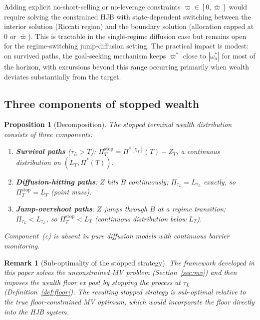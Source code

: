 \documentclass[11pt,a4paper]{article}
\numberwithin{equation}{section}
\newtheorem{proposition}[theorem]{Proposition}
\newtheorem{remark}[theorem]{Remark}
\begin{document}
Adding explicit no-short-selling or no-leverage constraints $\varpi \in [0, \bar\varpi]$ would require solving the constrained HJB with state-dependent switching between the interior solution (Riccati region) and the boundary solution (allocation capped at $0$ or $\bar\varpi$).  This is tractable in the single-regime diffusion case \citep{HuShiXu2022} but remains open for the regime-switching jump-diffusion setting.  The practical impact is modest: on survived paths, the goal-seeking mechanism keeps $\varpi^*$ close to $|\omega^*_a|$ for most of the horizon, with excursions beyond this range occurring primarily when wealth deviates substantially from the target.


\subsection{Three components of stopped wealth}\label{sec:three_comp}

\begin{proposition}[Decomposition]\label{prop:three_components}
The stopped terminal wealth distribution consists of three components:
\begin{enumerate}[label=(\alph*)]
\item \textbf{Survival paths} ($\tau_L > T$): $\Pi^{\mathrm{stop}}_T = \Pi^{*[\chi_T]}(T) - Z_T$, a continuous distribution on $(L_T, \Pi^*(T))$.
\item \textbf{Diffusion-hitting paths}: $Z$ hits $B$ continuously; $\Pi_{\tau_L} = L_{\tau_L}$ exactly, so $\Pi^{\mathrm{stop}}_T = L_T$ (point mass).
\item \textbf{Jump-overshoot paths}: $Z$ jumps through $B$ at a regime transition; $\Pi_{\tau_L} < L_{\tau_L}$, so $\Pi^{\mathrm{stop}}_T < L_T$ (continuous distribution below $L_T$).
\end{enumerate}
Component~(c) is absent in pure diffusion models with continuous barrier monitoring.
\end{proposition}

\begin{remark}[Sub-optimality of the stopped strategy]\label{rem:suboptimality}
The framework developed in this paper solves the unconstrained MV problem (Section~\ref{sec:mv}) and then imposes the wealth floor ex post by stopping the process at $\tau_L$ (Definition~\ref{def:floor}).  The resulting stopped strategy is sub-optimal relative to the true floor-constrained MV optimum, which would incorporate the floor directly into the HJB system.
\end{remark}
\end{document}
